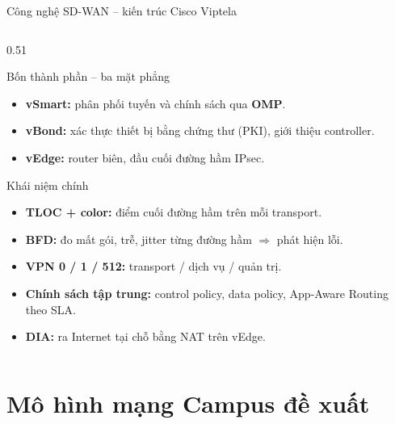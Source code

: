 \documentclass[aspectratio=169, 10pt, xcolor={table}]{beamer}
\newcommand{\compactlist}{\setlength{\itemsep}{1pt}\setlength{\parskip}{0pt}}
\begin{document}
\begin{frame}{Công nghệ SD-WAN -- kiến trúc Cisco Viptela}
\begin{columns}[c]
\begin{column}{0.51\textwidth}
\begin{card}{Bốn thành phần -- ba mặt phẳng}
\begin{itemize}
                    \item \textbf{vSmart:} phân phối tuyến và chính sách qua \textbf{OMP}.
                    \item \textbf{vBond:} xác thực thiết bị bằng chứng thư (PKI), giới thiệu controller.
                    \item \textbf{vEdge:} router biên, đầu cuối đường hầm IPsec.
                \end{itemize}
            \end{card}
            \begin{card}[accent]{Khái niệm chính}
                \scriptsize
                \begin{itemize}\compactlist
                    \item \textbf{TLOC + color:} điểm cuối đường hầm trên mỗi transport.
                    \item \textbf{BFD:} đo mất gói, trễ, jitter từng đường hầm $\Rightarrow$ phát hiện lỗi.
                    \item \textbf{VPN 0 / 1 / 512:} transport / dịch vụ / quản trị.
                    \item \textbf{Chính sách tập trung:} control policy, data policy, App-Aware Routing theo SLA.
                    \item \textbf{DIA:} ra Internet tại chỗ bằng NAT trên vEdge.
                \end{itemize}
            \end{card}
        \end{column}
    \end{columns}
\end{frame}

\section{Mô hình mạng Campus đề xuất}
\end{document}

